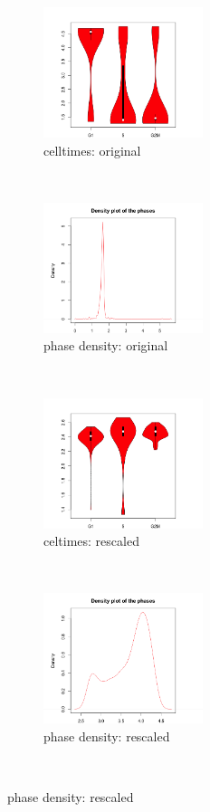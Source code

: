 \documentclass[11pt]{article}
\begin{document}
  \begin{figure}[ht]
    \centering    
     \begin{subfigure}[t]{0.5\textwidth}
        \centering
        \includegraphics[height=1.5in]{../figures/cell_order_R_figs/marioni_celltimes.png}
        \caption{celltimes: original}
    \end{subfigure}%
    ~
    \begin{subfigure}[t]{0.5\textwidth}
        \centering
        \includegraphics[height=1.5in]{../figures/cell_order_R_figs/marioni_phase_density.png}
        \caption{phase density: original}
    \end{subfigure}\\
    
     \begin{subfigure}[t]{0.5\textwidth}
        \centering
        \includegraphics[height=1.5in]{../figures/cell_order_R_figs/marioni_norm_celltimes.png}
        \caption{celtimes: rescaled}
    \end{subfigure}%
    ~
       \begin{subfigure}[t]{0.5\textwidth}
        \centering
        \includegraphics[height=1.5in]{../figures/cell_order_R_figs/marioni_phase_density_norm.png}
        \caption{phase density: rescaled}
    \end{subfigure}\\
   

\end{figure}
\end{document}

